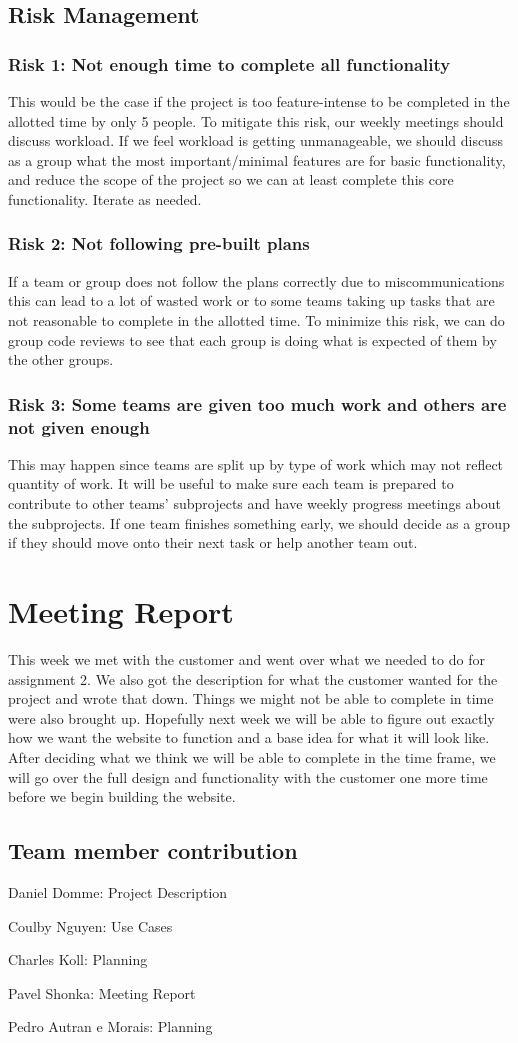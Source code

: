 \documentclass[12pt]{article}
\begin{document}
\subsection{Risk Management}
\subsubsection{Risk 1: Not enough time to complete all functionality}
This would be the case if the project is too feature-intense to be completed in the
allotted time by only 5 people. To mitigate this risk, our weekly meetings should discuss
workload. If we feel workload is getting unmanageable, we should discuss as a group what
the most important/minimal features are for basic functionality, and reduce the scope of
the project so we can at least complete this core functionality. Iterate as needed.
\subsubsection{Risk 2: Not following pre-built plans}
If a team or group does not follow the plans correctly due to miscommunications this can
lead to a lot of wasted work or to some teams taking up tasks that are not reasonable to
complete in the allotted time. To minimize this risk, we can do group code reviews to see
that each group is doing what is expected of them by the other groups.
\subsubsection{Risk 3: Some teams are given too much work and others are not given enough}
This may happen since teams are split up by type of work which may not reflect quantity of
work. It will be useful to make sure each team is prepared to contribute to other teams'
subprojects and have weekly progress meetings about the subprojects. If one team finishes
something early, we should decide as a group if they should move onto their next task or
help another team out.
\section{Meeting Report}
This week we met with the customer and went over what we needed to do for assignment 2. We
also got the description for what the customer wanted for the project and wrote that down.
Things we might not be able to complete in time were also brought up. Hopefully next week
we will be able to figure out exactly how we want the website to function and a base idea
for what it will look like. After deciding what we think we will be able to complete in
the time frame, we will go over the full design and functionality with the customer one
more time before we begin building the website.
\subsection{Team member contribution}
Daniel Domme: Project Description

Coulby Nguyen: Use Cases

Charles Koll: Planning

Pavel Shonka: Meeting Report

Pedro Autran e Morais: Planning



\end{document}
